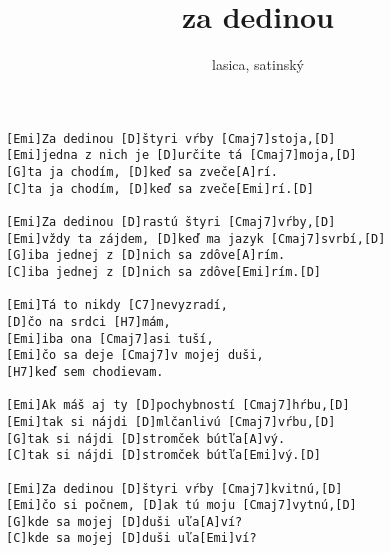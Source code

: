 \author{lasica, satinský}
\title{za dedinou}
\maketitle
\begin{verbatim}
[Emi]Za dedinou [D]štyri vŕby [Cmaj7]stoja,[D]
[Emi]jedna z nich je [D]určite tá [Cmaj7]moja,[D]
[G]ta ja chodím, [D]keď sa zveče[A]rí.
[C]ta ja chodím, [D]keď sa zveče[Emi]rí.[D]

[Emi]Za dedinou [D]rastú štyri [Cmaj7]vŕby,[D]
[Emi]vždy ta zájdem, [D]keď ma jazyk [Cmaj7]svrbí,[D]
[G]iba jednej z [D]nich sa zdôve[A]rím.
[C]iba jednej z [D]nich sa zdôve[Emi]rím.[D]

[Emi]Tá to nikdy [C7]nevyzradí,
[D]čo na srdci [H7]mám,
[Emi]iba ona [Cmaj7]asi tuší,
[Emi]čo sa deje [Cmaj7]v mojej duši,
[H7]keď sem chodievam.

[Emi]Ak máš aj ty [D]pochybností [Cmaj7]hŕbu,[D]
[Emi]tak si nájdi [D]mlčanlivú [Cmaj7]vŕbu,[D]
[G]tak si nájdi [D]stromček bútľa[A]vý.
[C]tak si nájdi [D]stromček bútľa[Emi]vý.[D]

[Emi]Za dedinou [D]štyri vŕby [Cmaj7]kvitnú,[D]
[Emi]čo si počnem, [D]ak tú moju [Cmaj7]vytnú,[D]
[G]kde sa mojej [D]duši uľa[A]ví?
[C]kde sa mojej [D]duši uľa[Emi]ví?
\end{verbatim}